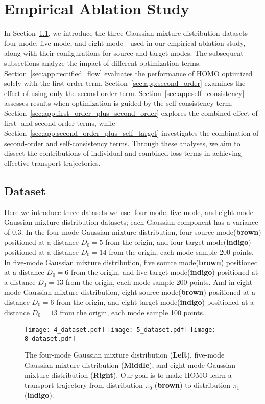 \section{Empirical Ablation Study} \label{sec:app:empirical_ablation_study}
In Section~\ref{sec:app:dataset}, we introduce the three Gaussian mixture distribution datasets—four-mode, five-mode, and eight-mode—used in our empirical ablation study, along with their configurations for source and target modes. The subsequent subsections analyze the impact of different optimization terms. Section~\ref{sec:app:rectified_flow} evaluates the performance of HOMO optimized solely with the first-order term. Section~\ref{sec:app:second_order} examines the effect of using only the second-order term. Section~\ref{sec:app:self_consistency} assesses results when optimization is guided by the self-consistency term. Section~\ref{sec:app:first_order_plus_second_order} explores the combined effect of first- and second-order terms, while Section~\ref{sec:app:second_order_plus_self_target} investigates the combination of second-order and self-consistency terms. Through these analyses, we aim to dissect the contributions of individual and combined loss terms in achieving effective transport trajectories.
\subsection{Dataset}\label{sec:app:dataset}

Here we introduce three datasets we use: four-mode, five-mode, and eight-mode Gaussian mixture distribution datasets; each Gaussian component has a variance of $0.3$. In the four-mode Gaussian mixture distribution, four source mode(\textbf{brown}) positioned at a distance $D_0 = 5$ from the origin, and four target mode(\textbf{indigo}) positioned at a distance $D_0 = 14$ from the origin, each mode sample 200 points. In five-mode Gaussian mixture distribution, five source mode(\textbf{brown}) positioned at a distance $D_0 = 6$ from the origin, and five target mode(\textbf{indigo}) positioned at a distance $D_0 = 13$ from the origin, each mode sample 200 points. And in eight-mode Gaussian mixture distribution, eight source mode(\textbf{brown}) positioned at a distance $D_0 = 6$ from the origin, and eight target mode(\textbf{indigo}) positioned at a distance $D_0 = 13$ from the origin, each mode sample 100 points. 

\begin{figure}[!ht] 
\centering
\texttt{[image: 4\_dataset.pdf]}
\texttt{[image: 5\_dataset.pdf]}
\texttt{[image: 8\_dataset.pdf]}
\caption{
The four-mode Gaussian mixture distribution (\textbf{Left}), five-mode Gaussian mixture distribution (\textbf{Middle}), and eight-mode Gaussian mixture distribution (\textbf{Right}). Our goal is to make HOMO learn a transport trajectory from distribution $\pi_0$ ({\textbf{brown}}) to distribution $\pi_1$ ({\textbf{indigo}}). 
}
\label{fig:three_normal_dataset}
\end{figure}

